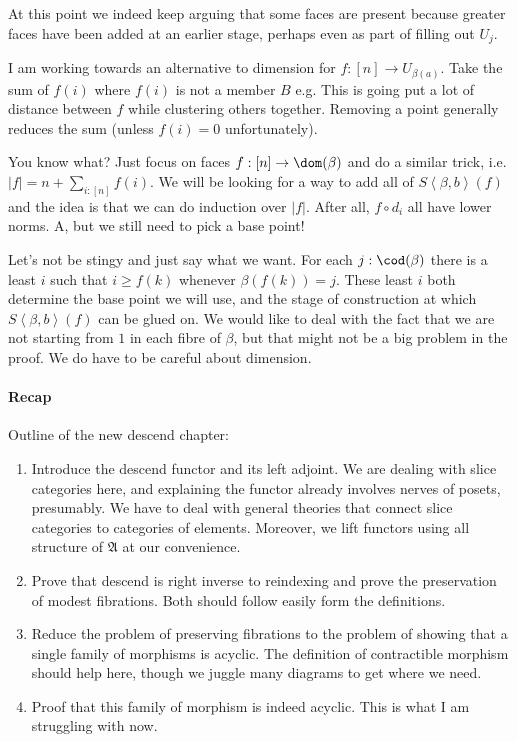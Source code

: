 \documentclass{tac}
\newcommand\of{:}
\newcommand\tuplet[1]{\left\langle #1 \right\rangle}
\newcommand\ambient{\mathfrak A}
\begin{document}
At this point we indeed keep arguing that some faces are present because
greater faces have been added at an earlier stage, perhaps even as part of filling out $U_j$.

I am working towards an alternative to dimension for $f:[n]\to U_{\beta(a)}$. Take the sum of $f(i)$ where $f(i)$ is not a member $B$ e.g.
This is going put a lot of distance between $f$ while clustering others together. Removing a point generally reduces the sum (unless $f(i) = 0$ unfortunately). 

You know what? Just focus on faces $f:[n]\to \dom(\beta)$ and do a similar trick, i.e. $|f| = n + \sum_{i\of [n]} f(i)$. We
will be looking for a way to add all of $S\tuplet{\beta,b}(f)$ and the
idea is that we can do induction over $|f|$. After all, $f\circ d_i$ all have lower norms. A, but we still need to pick a base point!

Let's not be stingy and just say what we want.
For each $j\of \cod(\beta)$ there is a least $i$ such that $i \geq f(k)$ whenever $\beta(f(k)) = j$. These least $i$ both determine the base point we will use, and the stage of
construction at which $S\tuplet{\beta,b}(f)$ can be glued on. We would
like to deal with the fact that we are not starting from $1$ in each fibre of $\beta$, but that might not be a big problem in the proof. We do have to be careful about dimension.

\paragraph{Recap}
Outline of the new descend chapter:
\begin{enumerate}
\item Introduce the descend functor and its left adjoint.
We are dealing with slice categories here, and explaining the functor
already involves nerves of posets, presumably. We have to deal with general theories that connect slice categories to categories of elements. Moreover, we lift functors using all structure of $\ambient$ at our convenience.
\item Prove that descend is right inverse to reindexing and prove the preservation of modest fibrations.
Both should follow easily form the definitions.
\item Reduce the problem of preserving fibrations to the problem of showing that a single family of morphisms is acyclic.
The definition of contractible morphism should help here, though we juggle many diagrams to get where we need.
\item Proof that this family of morphism is indeed acyclic.
This is what I am struggling with now.
\end{enumerate}
\end{document}
